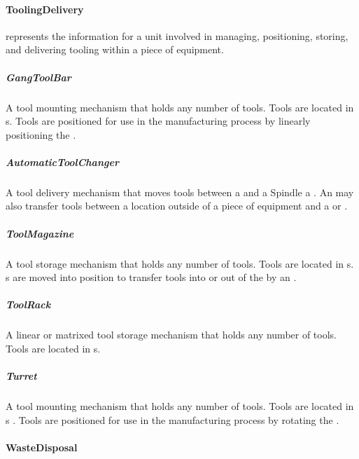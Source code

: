 \paragraph{ToolingDelivery}\mbox{}
\label{sec:ToolingDelivery}


 represents the information for a unit involved in managing, positioning, storing, and delivering tooling within a piece of equipment.




\subparagraph{GangToolBar}\mbox{}
\label{sec:GangToolBar}


A tool mounting mechanism that holds any number of tools. Tools are located in s. Tools are positioned for use in the manufacturing process by linearly positioning the .



\subparagraph{AutomaticToolChanger}\mbox{}
\label{sec:AutomaticToolChanger}


A tool delivery mechanism that moves tools between a  and a \gls{Spindle} a . An  may also transfer tools between a location outside of a piece of equipment and a  or .



\subparagraph{ToolMagazine}\mbox{}
\label{sec:ToolMagazine}


A tool storage mechanism that holds any number of tools. Tools are located in s. s are moved into position to transfer tools into or out of the  by an .



\subparagraph{ToolRack}\mbox{}
\label{sec:ToolRack}


A linear or matrixed tool storage mechanism that holds any number of tools. Tools are located in s.



\subparagraph{Turret}\mbox{}
\label{sec:Turret}


A tool mounting mechanism that holds any number of tools. Tools are located in s . Tools are positioned for use in the manufacturing process by rotating the .



\paragraph{WasteDisposal}\mbox{}
\label{sec:WasteDisposal}


